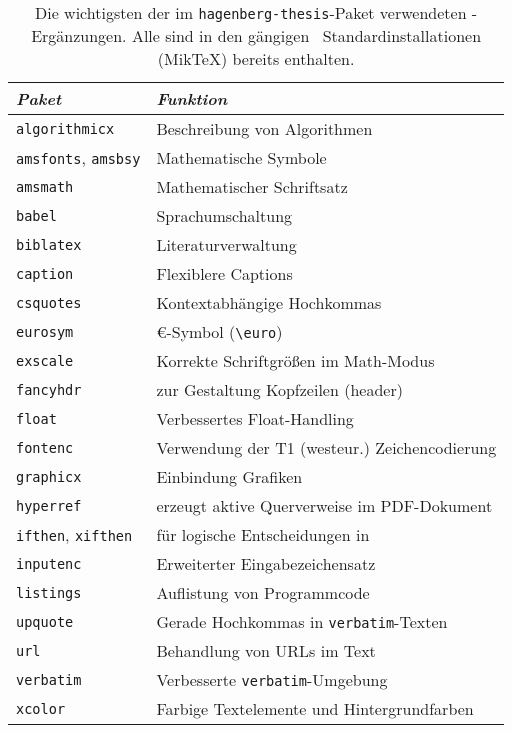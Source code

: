 \begin{table}
    \caption{Die wichtigsten der im \texttt{hagenberg-thesis}-Paket
    verwendeten \latex-Ergänzungen. Alle sind in den gängigen \latex\
    Standardinstallationen (\zB MikTeX) bereits enthalten.}
    \label{tab:packages}
    \centering\small
    \begin{tabular}{@{}ll@{}}
        \toprule
        \emph{Paket}          & \emph{Funktion} \\
        \midrule
        \texttt{algorithmicx} & Beschreibung von Algorithmen \\
        \texttt{amsfonts},
        \texttt{amsbsy}       & Mathematische Symbole \\
        \texttt{amsmath}      & Mathematischer Schriftsatz \\
        \texttt{babel}        & Sprachumschaltung \\
        \texttt{biblatex}     & Literaturverwaltung \\
        \texttt{caption}      & Flexiblere Captions \\
        \texttt{csquotes}     & Kontextabhängige Hochkommas \\
        \texttt{eurosym}      & {\euro}-Symbol (\verb!\euro!) \\
        \texttt{exscale}      & Korrekte Schriftgrößen im Math-Modus \\
        \texttt{fancyhdr}     & zur Gestaltung Kopfzeilen (header) \\
        \texttt{float}        & Verbessertes Float-Handling \\
        \texttt{fontenc}      & Verwendung der T1 (westeur.) Zeichencodierung \\
        \texttt{graphicx}     & Einbindung Grafiken \\
        \texttt{hyperref}     & erzeugt aktive Querverweise im PDF-Dokument\\
        \texttt{ifthen},
        \texttt{xifthen}      & für logische Entscheidungen in \latex \\
        \texttt{inputenc}     & Erweiterter Eingabezeichensatz \\
        \texttt{listings}     & Auflistung von Programmcode \\
        \texttt{upquote}      & Gerade Hochkommas in \texttt{verbatim}-Texten \\
        \texttt{url}          & Behandlung von URLs im Text \\
        \texttt{verbatim}     & Verbesserte \texttt{verbatim}-Umgebung\\
        \texttt{xcolor}       & Farbige Textelemente und Hintergrundfarben \\
        \bottomrule
    \end{tabular}
\end{table}


